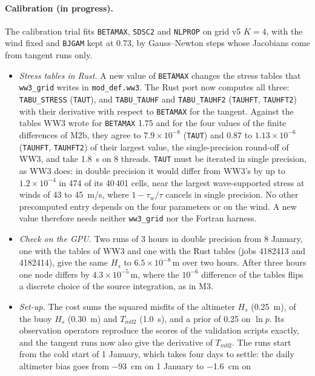 \documentclass[11pt,a4paper]{article}
\begin{document}
\paragraph{Calibration (in progress).} The calibration trial fits
\texttt{BETAMAX}, \texttt{SDSC2} and \texttt{NLPROP} on grid v5 $K=4$,
with the wind fixed and \texttt{BJGAM} kept at 0.73, by Gauss--Newton
steps whose Jacobians come from tangent runs only.
\begin{itemize}
\item \emph{Stress tables in Rust.} A new value of \texttt{BETAMAX}
changes the stress tables that \texttt{ww3\_grid} writes in
\texttt{mod\_def.ww3}. The Rust port now computes all three:
\texttt{TABU\_STRESS} (\texttt{TAUT}), and \texttt{TABU\_TAUHF} and
\texttt{TABU\_TAUHF2} (\texttt{TAUHFT}, \texttt{TAUHFT2}) with their
derivative with respect to \texttt{BETAMAX} for the tangent. Against the
tables WW3 wrote for \texttt{BETAMAX} 1.75 and for the four values of the
finite differences of M2b, they agree to $7.9\times10^{-8}$
(\texttt{TAUT}) and $0.87$ to $1.13\times10^{-6}$ (\texttt{TAUHFT},
\texttt{TAUHFT2}) of their largest value, the single-precision round-off
of WW3, and take \SI{1.8}{s} on 8 threads. \texttt{TAUT} must be iterated
in single precision, as WW3 does: in double precision it would differ from
WW3's by up to $1.2\times10^{-4}$ in 474 of its 40\,401 cells, near the
largest wave-supported stress at winds of 43 to \SI{45}{m/s}, where
$1-\tau_w/\tau$ cancels in single precision. No other precomputed entry
depends on the four parameters or on the wind. A new value therefore needs
neither \texttt{ww3\_grid} nor the Fortran harness.
\item \emph{Check on the GPU.} Two runs of 3 hours in double precision
from 8 January, one with the tables of WW3 and one with the Rust tables
(jobs 4182413 and 4182414), give the same $H_s$ to
$6.5\times10^{-8}$\,m over two hours. After three hours one node differs
by $4.3\times10^{-5}$\,m, where the $10^{-6}$ difference of the tables
flips a discrete choice of the source integration, as in M3.
\item \emph{Set-up.} The cost sums the squared misfits of the altimeter
$H_s$ (\SI{0.25}{m}), of the buoy $H_s$ (\SI{0.30}{m}) and $T_{m02}$
(\SI{1.0}{s}), and a prior of 0.25 on $\ln p$. Its observation operators
reproduce the scores of the validation scripts exactly, and the tangent
runs now also give the derivative of $T_{m02}$. The runs start from the
cold start of 1 January, which takes four days to settle: the daily
altimeter bias goes from \SI{-93}{cm} on 1 January to \SI{-1.6}{cm} on

\end{itemize}
\end{document}

